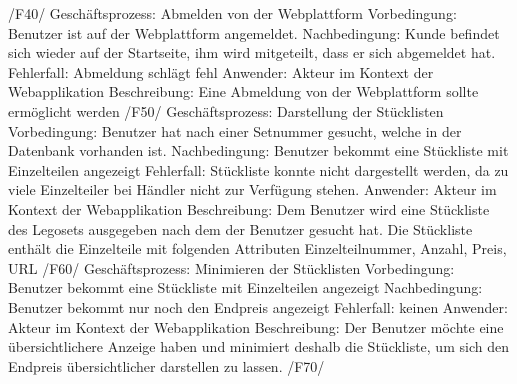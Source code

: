 /F40/ \newline
Geschäftsprozess: Abmelden von der Webplattform \newline
Vorbedingung: Benutzer ist auf der Webplattform angemeldet.\newline
Nachbedingung: Kunde befindet sich wieder auf der Startseite, ihm wird mitgeteilt, dass er sich abgemeldet hat. \newline
Fehlerfall: Abmeldung schlägt fehl \newline
Anwender: Akteur im Kontext der Webapplikation \newline 
Beschreibung: Eine Abmeldung von der Webplattform sollte ermöglicht werden \newline \newline
/F50/\newline
Geschäftsprozess: Darstellung der Stücklisten\newline
Vorbedingung: Benutzer hat nach einer Setnummer gesucht, welche in der Datenbank vorhanden ist.\newline
Nachbedingung: Benutzer bekommt eine Stückliste mit Einzelteilen angezeigt \newline
Fehlerfall: Stückliste konnte nicht dargestellt werden, da zu viele Einzelteiler bei Händler nicht zur Verfügung stehen. \newline
Anwender: Akteur im Kontext der Webapplikation \newline
Beschreibung: Dem Benutzer wird eine Stückliste des Legosets ausgegeben nach dem der Benutzer gesucht hat. Die Stückliste enthält die Einzelteile mit folgenden Attributen Einzelteilnummer, Anzahl, Preis, URL \newline\newline
/F60/\newline
Geschäftsprozess: Minimieren der Stücklisten\newline
Vorbedingung: Benutzer bekommt eine Stückliste mit Einzelteilen angezeigt\newline
Nachbedingung: Benutzer bekommt nur noch den Endpreis angezeigt\newline
Fehlerfall: keinen\newline
Anwender: Akteur im Kontext der Webapplikation \newline
Beschreibung: Der Benutzer möchte eine übersichtlichere Anzeige haben und minimiert deshalb die Stückliste, um sich den Endpreis übersichtlicher darstellen zu lassen.\newline\newline
/F70/\newline
